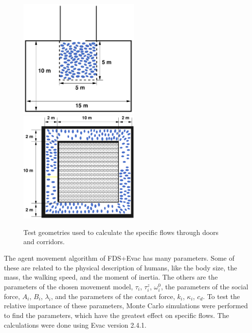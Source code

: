 \documentclass[12pt,a4paper,final,twoside]{stylevk}
\begin{document}
%
\begin{figure}[!tb]
  \centerline{ \includegraphics[clip=true,
    width=60mm]{FIGURES/Door_Geom} ~~~~~~~~   
    \includegraphics[clip=true,width=60mm]{FIGURES/CorrGeom2} }
  \caption{Test geometries used to calculate the specific flows through
    doors and corridors.\protect\hspace{200mm}}\label{Fig_Geoms}
\end{figure}
%

\noindent The agent movement algorithm of FDS+Evac has many
parameters.  Some of these are related to the physical description of
humans, like the body size, the mass, the walking speed, and the
moment of inertia.  The others are the parameters of the chosen
movement model, $\tau_i$, $\tau^z_i$, $\omega^0_i$, the parameters of
the social force, $A_i$, $B_i$, $\lambda_i$, and the parameters of the
contact force, $k_i$, $\kappa_i$, $c_d$.  To test the relative
importance of these parameters, Monte Carlo simulations were performed
to find the parameters, which have the greatest effect on specific
flows.  The calculations were done using Evac version 2.4.1.
\end{document}
